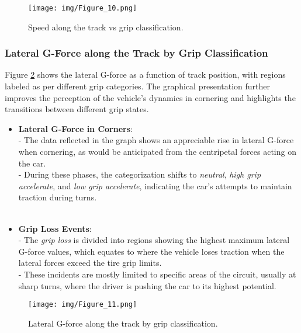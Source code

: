 \documentclass[a4paper,final,12pt]{report}
\begin{document}
\begin{figure}[H]
    \centering
    \texttt{[image: img/Figure\_10.png]}
    \caption{Speed along the track vs grip classification.}
    \label{fig:speed_grip_classification}
\end{figure}

\subsubsection{Lateral G-Force along the Track by Grip Classification}
Figure \ref{fig:lateral_gforce_grip_classification} shows the lateral G-force as a function of track position, with regions labeled as per different grip categories. The graphical presentation further improves the perception of the vehicle's dynamics in cornering and highlights the transitions between different grip states.

\begin{itemize}
    \item \textbf{Lateral G-Force in Corners}:\\
    - The data reflected in the graph shows an appreciable rise in lateral G-force when cornering, as would be anticipated from the centripetal forces acting on the car.\\
    - During these phases, the categorization shifts to \textit{neutral}, \textit{high grip accelerate}, and \textit{low grip accelerate}, indicating the car's attempts to maintain traction during turns.\\\\

    \item \textbf{Grip Loss Events}:\\
    - The \textit{grip loss} is divided into regions showing the highest maximum lateral G-force values, which equates to where the vehicle loses traction when the lateral forces exceed the tire grip limits.\\
    - These incidents are mostly limited to specific areas of the circuit, usually at sharp turns, where the driver is pushing the car to its highest potential.\\
\end{itemize}

\begin{figure}[H]
    \centering
    \texttt{[image: img/Figure\_11.png]}
    \caption{Lateral G-force along the track by grip classification.}
    \label{fig:lateral_gforce_grip_classification}
\end{figure}
\end{document}
